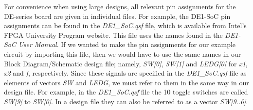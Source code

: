 \documentclass[11pt, twoside, pdftex]{article}
\begin{document}


{\tiny \tableofcontents}
\newpage

















For convenience when using large designs, all relevant pin assignments for the 
DE-series board are given in individual files. For example, the DE1-SoC pin assignments 
can be found in the {\it DE1\_SoC.qsf} file, which is available from Intel's FPGA University
Program website.
This file uses the names found in the {\it DE1-SoC User Manual}.
If we wanted to make the pin assignments for our example circuit by importing
this file, then we would have to use the same names in our 
Block Diagram/Schematic design file;
namely, {\it SW[0]}, {\it SW[1]} and {\it LEDG[0]} for 
{\it x1}, {\it x2} and {\it f}, respectively.
Since these signals are specified in the {\it DE1\_SoC.qsf} file
as elements of vectors {\it SW} and {\it LEDG}, we must refer to them in the same
way in our design file. For example, in the {\it DE1\_SoC.qsf} 
file the 10 toggle switches are called {\it SW[9]} to {\it SW[0]}.
In a design file they can also be referred to as a vector {\it SW[9..0]}.

\newpage






\end{document}
